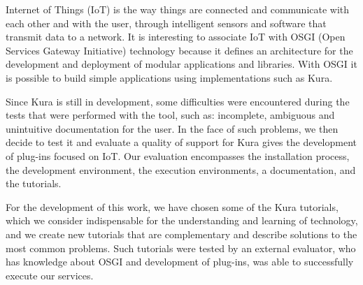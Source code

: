 Internet of Things (IoT) is the way things are connected and communicate with each other and with the user, through intelligent sensors and software that transmit data to a network. It is interesting to associate IoT with OSGI (Open Services Gateway Initiative) technology because it defines an architecture for the development and deployment of modular applications and libraries. With OSGI it is possible to build simple applications using implementations such as Kura.

\setlength{\parindent}{5ex} Since Kura is still in development, some difficulties were encountered during the tests that were performed with the tool, such as: incomplete, ambiguous and unintuitive documentation for the user. In the face of such problems, we then decide to test it and evaluate a quality of support for Kura gives the development of plug-ins focused on IoT. Our evaluation encompasses the installation process, the development environment, the execution environments, a documentation, and the tutorials. \par

For the development of this work, we have chosen some of the Kura tutorials, which we consider indispensable for the understanding and learning of technology, and we create new tutorials that are complementary and describe solutions to the most common problems. Such tutorials were tested by an external evaluator, who has knowledge about OSGI and development of plug-ins, was able to successfully execute our services. 